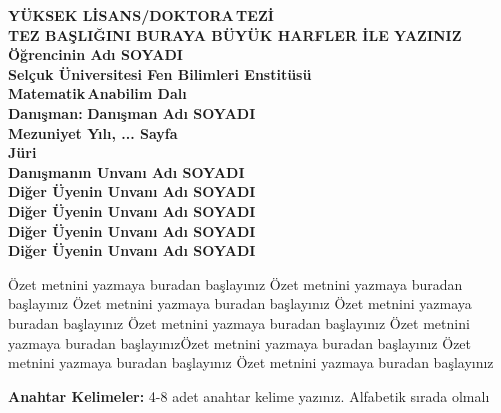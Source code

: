 \documentclass[12pt,oneside]{report}
\renewcommand{\thesisauthor}{Öğrencinin Adı SOYADI}    %
\renewcommand{\thesisdepartment}{Matematik}   %
\renewcommand{\thesisyear}{Mezuniyet Yılı}    %
\renewcommand{\thesisdegree}{YÜKSEK LİSANS/DOKTORA} %
\renewcommand{\thesistitleturkish}{TEZ BAŞLIĞINI BURAYA BÜYÜK HARFLER İLE YAZINIZ}
\renewcommand{\thesissupervisor}{Danışman Adı SOYADI}  %
\begin{document}
	\begin{thesisozet} 
		
		\begin{center}
			\textbf{\MakeUppercase \thesisdegree \,TEZ\.I} \bigskip\\
			\textbf{\MakeUppercase \thesistitleturkish} \bigskip \bigskip\\
			\textbf{\thesisauthor} \bigskip \\
			\textbf{Sel\c{c}uk \"{U}niversitesi Fen Bilimleri Enstit\"{u}s\"{u}}\\
			\textbf{\thesisdepartment \,Anabilim Dal\i } \bigskip \\
			\textbf{Dan\i\c{s}man:} \textbf{\thesissupervisor} \bigskip\\
			\textbf{\thesisyear, ... Sayfa } \bigskip\\ 
			\bigskip
			\textbf{Jüri} \\
			\textbf{Danışmanın Unvanı Adı SOYADI} \\%
			\textbf{Diğer Üyenin Unvanı Adı SOYADI} \\
			\textbf{Diğer Üyenin Unvanı Adı SOYADI} \\
			\textbf{Diğer Üyenin Unvanı Adı SOYADI} \\
			\textbf{Diğer Üyenin Unvanı Adı SOYADI} \\
									
		\end{center} \par
		\bigskip \bigskip
		\footnotesize Özet metnini yazmaya buradan başlayınız Özet metnini yazmaya buradan başlayınız Özet metnini yazmaya buradan başlayınız Özet metnini yazmaya buradan başlayınız Özet metnini yazmaya buradan başlayınız Özet metnini yazmaya buradan başlayınızÖzet metnini yazmaya buradan başlayınız Özet metnini yazmaya buradan başlayınız Özet metnini yazmaya buradan başlayınız 
		
		\footnotesize \textbf{Anahtar Kelimeler:}  4-8 adet anahtar kelime yazınız. Alfabetik sırada olmalı
	\end{thesisozet} 
	
	
\end{document}
